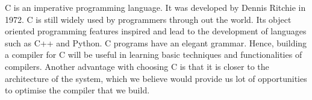 C is an imperative programming language. It was developed by Dennis 
Ritchie in 1972\cite{C}. C is still widely used by programmers through out the 
world. Its object oriented programming features inspired and lead to 
the development of languages such as C++ and Python. C programs have an 
elegant grammar. Hence, building a compiler for C will be useful in 
learning basic techniques and functionalities of compilers. Another 
advantage with choosing C is that it is closer to the architecture
of the system, which we believe would provide us lot of opportunities
to optimise the compiler that we build.